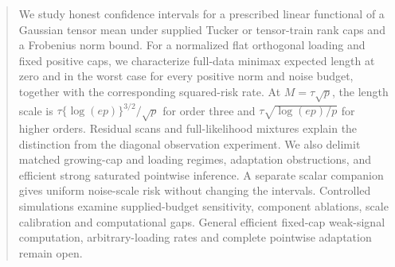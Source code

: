 \begin{abstract}
We study honest confidence intervals for a prescribed linear functional of a Gaussian tensor mean under supplied Tucker or tensor-train rank caps and a Frobenius norm bound. For a normalized flat orthogonal loading and fixed positive caps, we characterize full-data minimax expected length at zero and in the worst case for every positive norm and noise budget, together with the corresponding squared-risk rate. At $M=\tau\sqrt p$, the length scale is $\tau\{\log(ep)\}^{3/2}/\sqrt p$ for order three and $\tau\sqrt{\log(ep)/p}$ for higher orders. Residual scans and full-likelihood mixtures explain the distinction from the diagonal observation experiment. We also delimit matched growing-cap and loading regimes, adaptation obstructions, and efficient strong saturated pointwise inference. A separate scalar companion gives uniform noise-scale risk without changing the intervals. Controlled simulations examine supplied-budget sensitivity, component ablations, scale calibration and computational gaps. General efficient fixed-cap weak-signal computation, arbitrary-loading rates and complete pointwise adaptation remain open.
\end{abstract}
